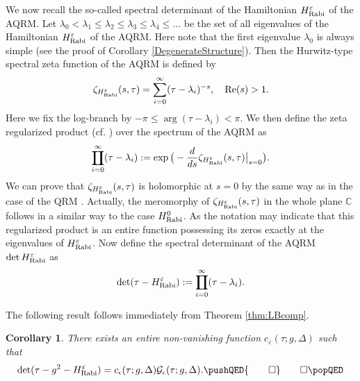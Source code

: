 \documentclass[11pt]{article}
\numberwithin{equation}{section}
\newcommand{\C}{\mathbb{C}} %
\newcommand{\e}{\varepsilon}
\newcommand{\HRabi}[1]{H_{\text{\upshape Rabi}}^{#1}} %
\DeclareMathOperator*{\regprod}{\mathchoice%
{\ooalign{\hbox{$\displaystyle\prod$}\crcr\hbox{$\displaystyle\coprod$}}}
{\ooalign{\hbox{$\textstyle\prod$}\crcr\hbox{$\textstyle\coprod$}}}
{\ooalign{\hbox{$\scriptstyle\prod$}\crcr\hbox{$\scriptstyle\coprod$}}}
{\ooalign{\hbox{$\scriptscriptstyle\prod$}\crcr\hbox{$\scriptscriptstyle\coprod$}}}}
\DeclareMathOperator{\RE}{Re}
\newcommand{\QEDhere}{\pushQED{\qed}\qedhere\popQED}
\theoremstyle{plain}
\newtheorem{cor}[thm]{Corollary}
\theoremstyle{definition}
\theoremstyle{remark}
\begin{document}
We now recall the so-called spectral determinant of the Hamiltonian $\HRabi{\e}$ of the AQRM.
Let $\lambda_0<\lambda_1\leq \lambda_2\leq \lambda_3\leq \lambda_4 \leq\ldots$ be the set of all eigenvalues of the Hamiltonian $\HRabi{\e}$ of the AQRM. Here note that the first
eigenvalue $\lambda_0$ is always simple (see the proof of Corollary \ref{DegenerateStructure}). Then the Hurwitz-type spectral zeta function of the
AQRM is defined by
\begin{equation}
  \zeta_{\HRabi{\e}}(s,\tau)= \sum_{i=0}^\infty (\tau- \lambda_i)^{-s}, \quad \RE(s)>1.
\end{equation}
Here we fix the log-branch by $-\pi\leq \arg(\tau- \lambda_i)<\pi$. We then define the zeta regularized product (cf. \cite{QHS1993TAMS}) over the spectrum of
the AQRM as
\begin{equation}\label{eq:ZRProduct}
  \regprod_{i=0}^\infty (\tau-\lambda_i):= \exp\big(-\frac{d}{ds}\zeta_{\HRabi{\e}}(s,\tau)\big|_{s=0}\big).
\end{equation}
We can prove that $\zeta_{\HRabi{\e}}(s,\tau)$ is holomorphic at $s=0$ by the same way as in the case of the QRM \cite{Sugi2016}. Actually, the meromorphy
of $\zeta_{\HRabi{\e}}(s,\tau)$ in the whole plane $\C$ follows in a similar way to the case $\HRabi{0}$. As the notation may indicate that this regularized
product is an entire function possessing its zeros exactly at the eigenvalues of $\HRabi{\e}$. Now define the spectral determinant of the
AQRM $\det \HRabi{\e}$ as
\begin{equation}
  \det (\tau-\HRabi{\e}):= \regprod_{i=0}^\infty (\tau-\lambda_i).
\end{equation}

The following result follows immediately from Theorem \ref{thm:LBcomp}.

\begin{cor}\label{cor:SDE}
  There exists an entire non-vanishing function $c_{\e}(\tau ; g,\Delta)$ such that
  \begin{equation}
    \det (\tau-g^2-\HRabi{\e}) =  c_{\epsilon}(\tau;g,\Delta) \mathcal{G}_{\epsilon}(\tau;g,\Delta).
    \QEDhere
  \end{equation}
\end{cor}
\end{document}
